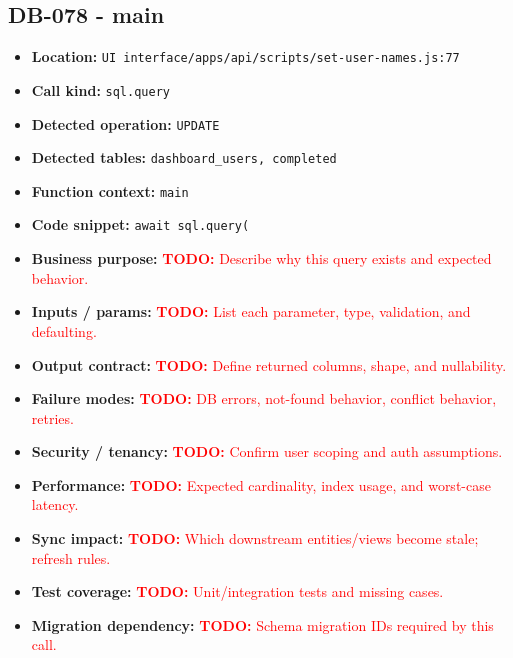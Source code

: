 \documentclass[11pt]{article}
\newcommand{\todoitem}[1]{\textcolor{red}{\textbf{TODO:} #1}}
\begin{document}
\subsection{DB-078 - main}
\begin{itemize}[leftmargin=1.5em]
\item \textbf{Location:} \texttt{UI interface/apps/api/scripts/set-user-names.js:77}
\item \textbf{Call kind:} \texttt{sql.query}
\item \textbf{Detected operation:} \texttt{UPDATE}
\item \textbf{Detected tables:} \texttt{dashboard\_users, completed}
\item \textbf{Function context:} \texttt{main}
\item \textbf{Code snippet:} \texttt{await sql.query(}
\item \textbf{Business purpose:} \todoitem{Describe why this query exists and expected behavior.}
\item \textbf{Inputs / params:} \todoitem{List each parameter, type, validation, and defaulting.}
\item \textbf{Output contract:} \todoitem{Define returned columns, shape, and nullability.}
\item \textbf{Failure modes:} \todoitem{DB errors, not-found behavior, conflict behavior, retries.}
\item \textbf{Security / tenancy:} \todoitem{Confirm user scoping and auth assumptions.}
\item \textbf{Performance:} \todoitem{Expected cardinality, index usage, and worst-case latency.}
\item \textbf{Sync impact:} \todoitem{Which downstream entities/views become stale; refresh rules.}
\item \textbf{Test coverage:} \todoitem{Unit/integration tests and missing cases.}
\item \textbf{Migration dependency:} \todoitem{Schema migration IDs required by this call.}
\end{itemize}
\end{document}
